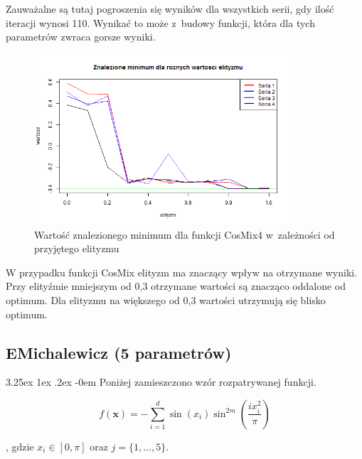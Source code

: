 \documentclass[11pt, a4paper]{article}
\makeatletter
\newcommand{\fbi}{\leavevmode{\parindent=1em\indent}}
\renewcommand\paragraph{\@startsection{paragraph}{5}{\z@}
  {3.25ex \@plus1ex \@minus.2ex}
  {-0em}
  {\normalfont\normalsize\bfseries}}
\makeatother
\begin{document}
\fbi
Zauważalne są tutaj pogroszenia się wyników dla wszystkich serii, gdy ilość iteracji wynosi 110. Wynikać to może z~budowy funkcji, która dla tych parametrów zwraca gorsze wyniki.

\begin{figure}[H]
	\begin{center}
		\includegraphics[width=0.85\textwidth]{./assets/CosMix46.png}
		\caption{Wartość znalezionego minimum dla funkcji CosMix4 w~zależności od przyjętego elityzmu}
		\label{fig:cosmix46}
	\end{center}
\end{figure}

\fbi
W przypadku funkcji CosMix elityzm ma znaczący wpływ na otrzymane wyniki. Przy elityźmie mniejszym od 0,3 otrzymane wartości są znacząco oddalone od optimum. Dla elityzmu na większego od 0,3 wartości utrzymują się blisko optimum.

\newpage
\subsection{EMichalewicz (5 parametrów)}
\paragraph{}
Poniżej zamieszczono wzór rozpatrywanej funkcji.

\begin{equation}\label{eq:emichalewicz}
f(\boldsymbol{x}) = - \sum_{i=1}^{d} \sin(x_i) \sin^{2m} (\frac{i x_i^2}{\pi})
\end{equation}

, gdzie $ x_i \in [0, \pi]$ oraz $j = \{1, ..., 5\}$.
\end{document}
